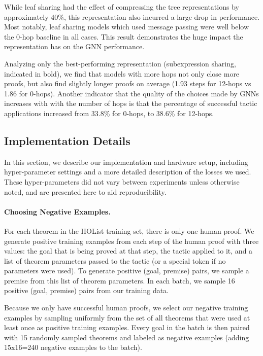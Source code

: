 \documentclass[letterpaper]{article} \usepackage{aaai20}  \usepackage{times}  \usepackage{helvet} \usepackage{courier}  \usepackage[hyphens]{url}  \usepackage{graphicx} \urlstyle{rm} \def\UrlFont{\rm}  \usepackage{graphicx}  \frenchspacing  \setlength{\pdfpagewidth}{8.5in}  \setlength{\pdfpageheight}{11in}
\newcommand{\todo}[1]{}
\begin{document}
While leaf sharing had the effect of compressing the tree representations by approximately 40\%, this representation also incurred a large drop in performance.
Most notably, leaf sharing models which used message passing were well below the 0-hop baseline in all cases.
This result demonstrates the huge impact the representation has on the GNN performance.

Analyzing only the best-performing representation (subexpression sharing, indicated in bold), we find that models with more hops not only close more proofs, but also find slightly longer proofs on average (1.93 steps for 12-hops vs 1.86 for 0-hops).
Another indicator that the quality of the choices made by GNNs increases with with the number of hops is that the percentage of successful tactic applications increased from 33.8\% for 0-hops, to 38.6\% for 12-hops.  








\subsection{Implementation Details}
In this section, we describe our implementation and hardware setup, including hyper-parameter settings and a more detailed description of the losses we used. These hyper-parameters did not vary between experiments unless otherwise noted, and are presented here to aid reproducibility. 
\todo{Discuss hyperparameter sweep/give some indication that these params are reasonable.}

\paragraph{Choosing Negative Examples.}
For each theorem in the HOList training set, there is only one human proof.  We generate positive training examples from each step of the human proof with three values: the goal that is being proved at that step, the tactic applied to it, and a list of theorem parameters passed to the tactic (or a special token if no parameters were used).  To generate positive (goal, premise) pairs, we sample a premise from this list of theorem parameters.  In each batch, we sample 16 positive (goal, premise) pairs from our training data.

Because we only have successful human proofs, we select our negative training examples by sampling uniformly from the set of all theorems that were used at least once as positive training examples.  Every goal in the batch is then paired with 15 randomly sampled theorems and labeled as negative examples (adding 15x16=240 negative examples to the batch).
\end{document}
